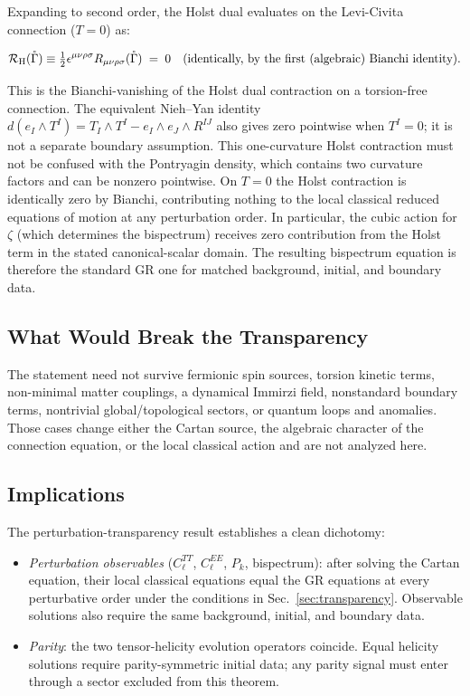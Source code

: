 \documentclass[aps,prd,twocolumn,superscriptaddress,preprintnumbers,nofootinbib,longbibliography,floatfix]{revtex4-2}
\begin{document}
Expanding to second order, the Holst dual evaluates on the Levi-Civita
connection ($T=0$) as:
\begin{widetext}
\begin{equation}
\mathcal{R}_{\rm H}(\mathring{\Gamma}) \equiv \tfrac{1}{2}\epsilon^{\mu\nu\rho\sigma}
R_{\mu\nu\rho\sigma}(\mathring{\Gamma}) \;=\; 0
\quad\text{(identically, by the first (algebraic) Bianchi identity)}.
\end{equation}
\end{widetext}
This is the Bianchi-vanishing of the Holst dual contraction on a torsion-free
connection.  The equivalent Nieh--Yan identity
$d(e_I\wedge T^I)=T_I\wedge T^I-e_I\wedge e_J\wedge R^{IJ}$ also gives zero
pointwise when $T^I=0$; it is not a separate boundary assumption.  This
one-curvature Holst contraction must not be confused with the Pontryagin
density, which contains two curvature factors and can be nonzero pointwise.
On $T=0$ the Holst contraction is identically zero by Bianchi, contributing
nothing to the local classical reduced equations of motion at any perturbation order. In
particular, the cubic action for $\zeta$ (which determines the bispectrum)
receives zero contribution from the Holst term in the stated canonical-scalar
domain. The resulting bispectrum equation is therefore the standard GR one
for matched background, initial, and boundary data.

\subsection{What Would Break the Transparency}

The statement need not survive fermionic spin sources, torsion kinetic terms,
non-minimal matter couplings, a dynamical Immirzi field, nonstandard boundary
terms, nontrivial global/topological sectors, or quantum loops and anomalies.
Those cases change either the Cartan source, the algebraic character of the
connection equation, or the local classical action and are not analyzed here.

\subsection{Implications}

The perturbation-transparency result establishes a clean dichotomy:
\begin{itemize}[leftmargin=*]
\item \textit{Perturbation observables} ($C_\ell^{TT}$, $C_\ell^{EE}$, $P_k$,
bispectrum): after solving the Cartan equation, their local classical equations
equal the GR equations at every perturbative order under the conditions in
Sec.~\ref{sec:transparency}.  Observable solutions also require the same
background, initial, and boundary data.
\item \textit{Parity}: the two tensor-helicity evolution operators coincide.
Equal helicity solutions require parity-symmetric initial data; any parity
signal must enter through a sector excluded from this theorem.
\end{itemize}
\end{document}
